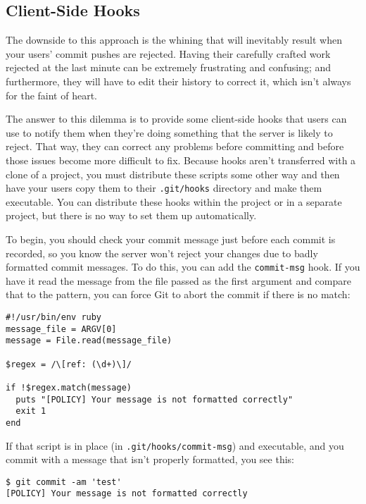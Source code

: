 \documentclass[a4paper]{book}
\newcounter{tab}[chapter]
\begin{document}
\subsection{Client-Side Hooks}

The downside to this approach is the whining that will inevitably result when your users' commit pushes are rejected. Having their carefully crafted work rejected at the last minute can be extremely frustrating and confusing; and furthermore, they will have to edit their history to correct it, which isn't always for the faint of heart.

The answer to this dilemma is to provide some client-side hooks that users can use to notify them when they're doing something that the server is likely to reject. That way, they can correct any problems before committing and before those issues become more difficult to fix. Because hooks aren't transferred with a clone of a project, you must distribute these scripts some other way and then have your users copy them to their \texttt{.git/hooks} directory and make them executable. You can distribute these hooks within the project or in a separate project, but there is no way to set them up automatically.

To begin, you should check your commit message just before each commit is recorded, so you know the server won't reject your changes due to badly formatted commit messages. To do this, you can add the \texttt{commit-msg} hook. If you have it read the message from the file passed as the first argument and compare that to the pattern, you can force Git to abort the commit if there is no match:

\begin{shaded}\begin{verbatim}
#!/usr/bin/env ruby
message_file = ARGV[0]
message = File.read(message_file)

$regex = /\[ref: (\d+)\]/

if !$regex.match(message)
  puts "[POLICY] Your message is not formatted correctly"
  exit 1
end
\end{verbatim}\end{shaded}

If that script is in place (in \texttt{.git/hooks/commit-msg}) and executable, and you commit with a message that isn't properly formatted, you see this:

\begin{shaded}\begin{verbatim}
$ git commit -am 'test'
[POLICY] Your message is not formatted correctly
\end{verbatim}\end{shaded}
\end{document}
